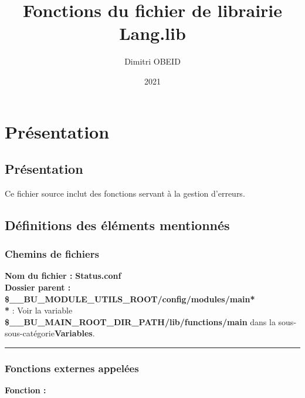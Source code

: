 \documentclass[a4paper,10pt]{article}
\title{\color{red}Fonctions du fichier de librairie \color{lime}Lang.lib}\color{white}
\author{Dimitri OBEID}
\date{2021}
\begin{document}
 \maketitle
 \tableofcontents
 \newpage

\color{red}
\section{Présentation}\color{white}

\color{green}
\subsection{Présentation}\color{white}
Ce fichier source inclut des fonctions servant à la gestion d'erreurs.\\[1\baselineskip]

\color{green}
\subsection{Définitions des éléments mentionnés}\color{white}

\color{blue}
\subsubsection{Chemins de fichiers}\color{white}
\textbf{Nom du fichier :} \textbf{\color{lime}Status.conf\color{white}}\\[1\baselineskip]
\textbf{Dossier parent :} \textbf{\color{lime}\$\_\_BU\_MODULE\_UTILS\_ROOT/config/modules/main\color{white}*}\\[1\baselineskip]

\textbf{*} : Voir la variable \textbf{\color{orange}\$\_\_BU\_MAIN\_ROOT\_DIR\_PATH/lib/functions/main\color{white}} dans la sous-sous-catégorie\linebreak \textbf{\color{blue}Variables\color{white}}.\\[1\baselineskip]



\color{blue}\par\noindent\rule{\textwidth}{0.4pt}\color{white}

\color{blue}
\subsubsection{Fonctions externes appelées}\color{white}
\textbf{Fonction :} \textbf{\color{mauve}\color{white}}\\[1\baselineskip]
\end{document}
